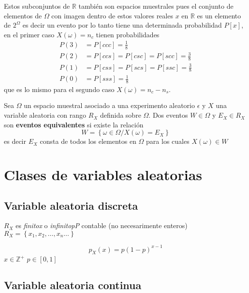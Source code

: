 \documentclass[10pt,]{krantz}
\theoremstyle{definition}
\theoremstyle{definition}
\theoremstyle{definition}
\theoremstyle{remark}
\let\BeginKnitrBlock\begin \let\EndKnitrBlock\end
\begin{document}
Estos subconjuntos de \(\mathbb{R}\) también son espacios muestrales pues el conjunto de elementos de \(\Omega\) con imagen dentro de estos valores reales \(x\) en \(\mathbb{R}\) es un elemento de \(2^{\Omega}\) es decir un evento por lo tanto tiene una determinada probabilidad \(P[x]\), en el primer caso \(X(\omega)=n_c\) tienen probabilidades\\
\begin{align*}
  P(3)&=P[ccc]= \frac{1}{8}\\
  P(2)&=P[ccs]=P[csc]=P[scc]=\frac{3}{8}\\
  P(1)&=P[css]=P[scs]=P[ssc]=\frac{3}{8}\\
  P(0)&=P[sss]=\frac{1}{8}
\end{align*}
que es lo mismo para el segundo caso \(X(\omega)=n_c-n_s\).
\BeginKnitrBlock{definition}[Eventos equivalentes]
\protect\hypertarget{def:unnamed-chunk-10}{}{\label{def:unnamed-chunk-10} \iffalse (Eventos equivalentes) \fi{} }Sea \(\Omega\) un espacio muestral asociado a una experimento aleatorio \(\epsilon\) y \(X\) una variable aleatoria con rango \(R_X\) definida sobre \(\Omega\). Dos eventos \(W\in\Omega\) y \(E_X\in R_X\) son \textbf{eventos equivalentes} si existe la relación
\[W= \left\{\omega\in\Omega/X(\omega)=E_X\right\}\] es decir \(E_X\) consta de todos los elementos en \(\Omega\) para los cuales \(X(\omega)\in W\)
\EndKnitrBlock{definition}

\hypertarget{clases-de-variables-aleatorias}{%
\section{Clases de variables aleatorias}\label{clases-de-variables-aleatorias}}

\hypertarget{variable-aleatoria-discreta}{%
\subsection{Variable aleatoria discreta}\label{variable-aleatoria-discreta}}

\(R_X\) es \emph{finitox} o \emph{infinitopP} contable (no necesarimente enteros)
\(R_X= \left\{x_1,x_2,\ldots,x_n\ldots\right\}\)

\[p_X(x)=p(1-p)^{x-1}\] \(x\in \mathbb{Z}^+\) \(p\in[0,1]\)

\hypertarget{variable-aleatoria-continua}{%
\subsection{Variable aleatoria continua}\label{variable-aleatoria-continua}}
\end{document}
